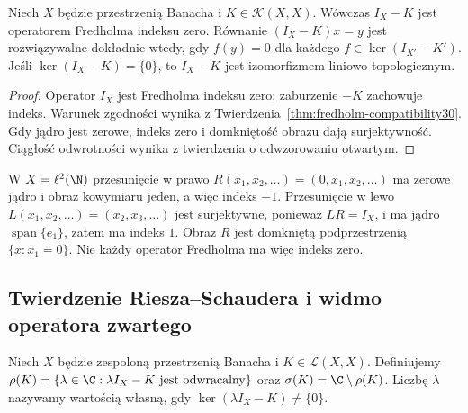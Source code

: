 \begin{wniosek}
\label{cor:fredholm-banach30}
Niech $X$ będzie przestrzenią Banacha i
$K\in\mathcal K(X,X)$. Wówczas $I_X-K$ jest operatorem
Fredholma indeksu zero. Równanie $(I_X-K)x=y$ jest
rozwiązywalne dokładnie wtedy, gdy $f(y)=0$ dla każdego
$f\in\ker(I_{X'}-K')$. Jeśli $\ker(I_X-K)=\{0\}$,
to $I_X-K$ jest izomorfizmem liniowo-topologicznym.
\end{wniosek}
\begin{proof}
Operator $I_X$ jest Fredholma indeksu zero; zaburzenie
$-K$ zachowuje indeks. Warunek zgodności wynika z
Twierdzenia~\ref{thm:fredholm-compatibility30}. Gdy jądro
jest zerowe, indeks zero i domkniętość obrazu dają
surjektywność. Ciągłość odwrotności wynika z twierdzenia
o odwzorowaniu otwartym.
\end{proof}

\begin{przyklad}
\label{ex:shift-index30}
W $X=\ell^2(\N)$ przesunięcie w prawo
$R(x_1,x_2,\ldots)=(0,x_1,x_2,\ldots)$ ma zerowe jądro
i obraz kowymiaru jeden, a więc indeks $-1$.
Przesunięcie w lewo $L(x_1,x_2,\ldots)=(x_2,x_3,\ldots)$
jest surjektywne, ponieważ $LR=I_X$, i ma jądro
$\operatorname{span}\{e_1\}$, zatem ma indeks $1$.
Obraz $R$ jest domkniętą podprzestrzenią $\{x:x_1=0\}$.
Nie każdy operator Fredholma ma więc indeks zero.
\end{przyklad}

\subsection{Twierdzenie Riesza--Schaudera i widmo operatora zwartego}

\begin{definicja}
\label{def:spectrum30}
Niech $X$ będzie zespoloną przestrzenią Banacha i
$K\in\mathcal L(X,X)$. Definiujemy
$\rho(K)=\{\lambda\in\C:\lambda I_X-K\text{ jest odwracalny}\}$
oraz $\sigma(K)=\C\setminus\rho(K)$.
Liczbę $\lambda$ nazywamy wartością własną, gdy
$\ker(\lambda I_X-K)\ne\{0\}$.
\end{definicja}

